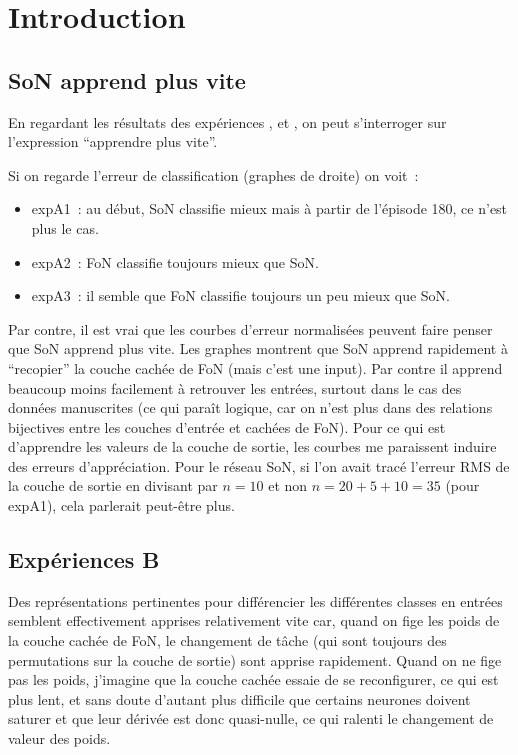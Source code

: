 \section{Introduction
\label{sec:intro}}
\subsection{SoN apprend plus vite
\label{sec:app_vite}}
En regardant les résultats des expériences ,  et , on peut s'interroger sur l'expression ``apprendre plus vite''.

Si on regarde l'erreur de classification (graphes de droite) on voit~:
\begin{itemize}
\item expA1~: au début, SoN classifie mieux mais à partir de l'épisode 180, ce n'est plus le cas.
\item expA2~: FoN classifie toujours mieux que SoN.
\item expA3~: il semble que FoN classifie toujours un peu mieux que SoN.
\end{itemize}

Par contre, il est vrai que les courbes d'erreur normalisées peuvent faire penser que SoN apprend plus vite. Les graphes montrent que SoN apprend rapidement à ``recopier'' la couche cachée de FoN (mais c'est une input). Par contre il apprend beaucoup moins facilement à retrouver les entrées, surtout dans le cas des données manuscrites (ce qui paraît logique, car on n'est plus dans des relations bijectives entre les couches d'entrée et cachées de FoN). Pour ce qui est d'apprendre les valeurs de la couche de sortie, les courbes me paraissent induire des erreurs d'appréciation. Pour le réseau SoN, si l'on avait tracé l'erreur RMS de la couche de sortie en divisant par $n=10$ et non $n=20+5+10=35$ (pour expA1), cela parlerait peut-être plus.

\subsection{Expériences B
\label{sec:expB}}

Des représentations pertinentes pour différencier les différentes classes en entrées semblent effectivement apprises relativement vite car, quand on fige les poids de la couche cachée de FoN, le changement de tâche (qui sont toujours des permutations sur la couche de sortie) sont apprise rapidement. Quand on ne fige pas les poids, j'imagine que la couche cachée essaie de se reconfigurer, ce qui est plus lent, et sans doute d'autant plus difficile que certains neurones doivent saturer et que leur dérivée est donc quasi-nulle, ce qui ralenti le changement de valeur des poids.

